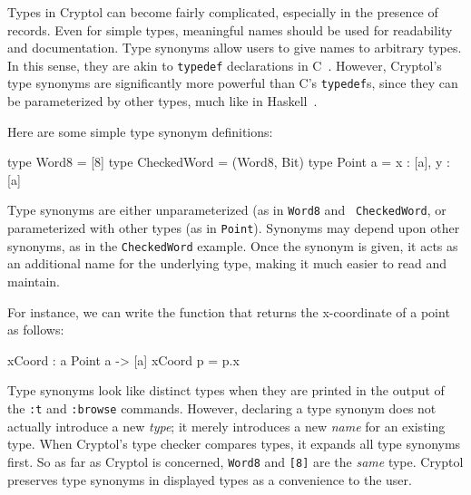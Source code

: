 

Types in Cryptol can become fairly complicated, especially in the
presence of records.  Even for simple types, meaningful names should
be used for readability and documentation.  Type synonyms allow users
to give names to arbitrary types.  In this sense, they are akin to
{\tt typedef} declarations in C~\cite{TheCProgrammingLanguage}.
However, Cryptol's type synonyms are significantly more powerful than
C's {\tt typedef}s, since they can be parameterized by other types,
much like in Haskell~\cite{Has98}.


Here are some simple type synonym definitions:
\begin{code}
  type Word8       = [8]
  type CheckedWord = (Word8, Bit)
  type Point a     = {x : [a], y : [a]}
\end{code}


Type synonyms are either unparameterized (as in {\tt Word8} and {\tt
  CheckedWord}, or parameterized with other types (as in {\tt Point}).
Synonyms may depend upon other synonyms, as in the {\tt CheckedWord}
example.  Once the synonym is given, it acts as an additional name for
the underlying type, making it much easier to read and
maintain.

For instance, we can write the function that returns the x-coordinate
of a point as follows:
\begin{code}
  xCoord : {a} Point a -> [a]
  xCoord p = p.x
\end{code}

Type synonyms look like distinct types when they are printed in the
output of the \texttt{:t} and \texttt{:browse} commands. However,
declaring a type synonym does not actually introduce a new
\emph{type}; it merely introduces a new \emph{name} for an existing
type. When Cryptol's type checker compares types, it expands all type
synonyms first. So as far as Cryptol is concerned, \texttt{Word8} and
\texttt{[8]} are the \emph{same} type. Cryptol preserves type synonyms
in displayed types as a convenience to the user.

